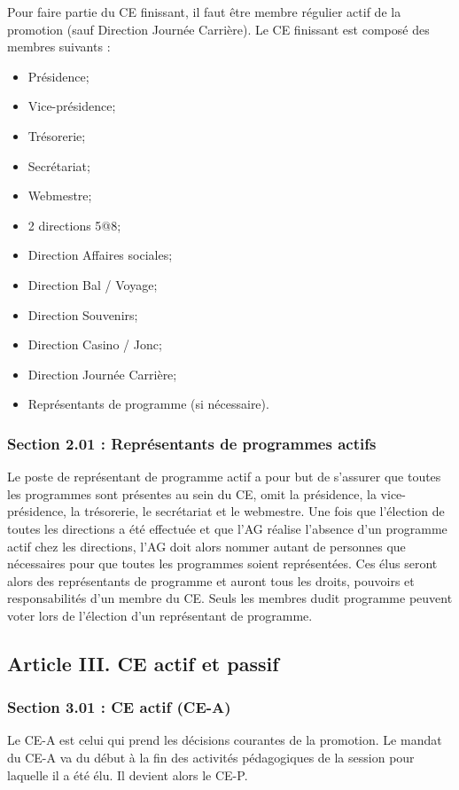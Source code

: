 Pour faire partie du CE finissant, il faut être membre régulier actif de la promotion (sauf Direction Journée Carrière). Le CE finissant est composé des membres suivants :
\begin{itemize}
\item Présidence; 
\item Vice-présidence; 
\item Trésorerie; 
\item Secrétariat;
\item Webmestre; 
\item 2 directions 5@8;
\item Direction Affaires sociales; 
\item Direction Bal / Voyage; 
\item Direction Souvenirs;
\item Direction Casino / Jonc; 
\item Direction Journée Carrière;
\item Représentants de programme  (si nécessaire).
\end{itemize}

\subsubsection*{Section 2.01 : Représentants de programmes actifs}
Le poste de représentant de programme actif a pour but de s’assurer que toutes les programmes sont présentes au sein du CE, omit la présidence, la vice-présidence, la trésorerie, le secrétariat et le webmestre. Une fois que l’élection de toutes les directions a été effectuée et que l’AG réalise l’absence d’un programme actif chez les directions, l’AG doit alors nommer autant de personnes que nécessaires pour que toutes les programmes soient représentées. Ces élus seront alors des représentants de programme  et auront tous les droits, pouvoirs et responsabilités d’un membre du CE. Seuls les membres dudit programme peuvent voter lors de l’élection d’un représentant de programme.

\subsection*{Article III. CE actif et passif}

\subsubsection*{Section 3.01 : CE actif (CE-A)}
Le CE-A est celui qui prend les décisions courantes de la promotion. Le mandat du CE-A va du début à la fin des activités pédagogiques de la session pour laquelle il a été élu. Il devient alors le CE-P.

